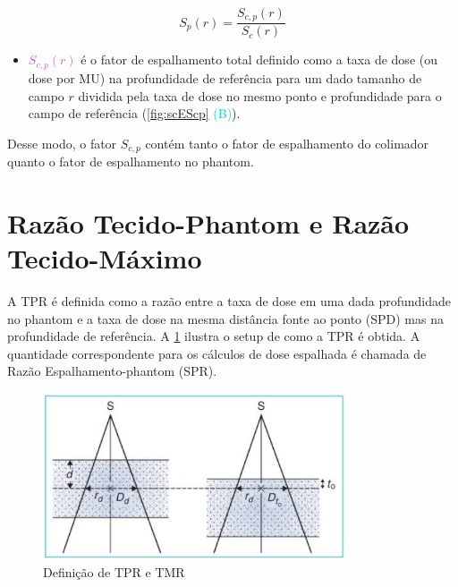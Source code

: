 \documentclass[11pt,a4paper]{article}
\newcounter{exemplo}
\begin{document}
        \begin{equation}
            S_{p}(r) = \frac{S_{c,p}(r)}{S_c(r)}
            \label{eq:scpPraSp}
        \end{equation}

        \begin{exemplo}[onde:]
            \begin{itemize}
                \item \textcolor{MediumOrchid}{$S_{c,p}(r)$} é o fator de espalhamento total definido como a taxa de dose (ou dose por MU) na profundidade de referência para um dado tamanho de campo $r$ dividida pela taxa de dose no mesmo ponto e profundidade para o campo de referência (\ref{fig:scEScp} \textcolor{DarkTurquoise}{(B)}).
            \end{itemize}
        \end{exemplo}

    Desse modo, o fator $S_{c,p}$ contém tanto o fator de espalhamento do colimador quanto o fator de espalhamento no phantom.

    \section{Razão Tecido-Phantom e Razão Tecido-Máximo}

    A TPR é definida como a razão entre a taxa de dose em uma dada profundidade no phantom e a taxa de dose na mesma distância fonte ao ponto (SPD) mas na profundidade de referência. A \ref{fig:tprTmr} ilustra o setup de como a TPR é obtida. A quantidade correspondente para os cálculos de dose espalhada é chamada de Razão Espalhamento-phantom (SPR). 

    \begin{figure}[h]
        \centering
        \includegraphics[width=0.8\textwidth]{Imagens/tprTmr.JPG}
        \caption{Definição de TPR e TMR}
        \label{fig:tprTmr}                
    \end{figure}
\end{document}
